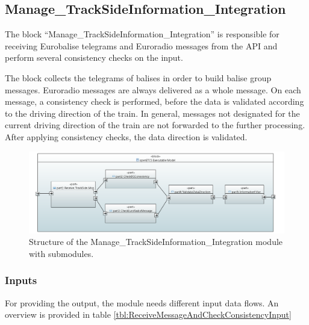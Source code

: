 
\subsection{Manage\_TrackSideInformation\_Integration}

The block ``Manage\_TrackSideInformation\_Integration'' is responsible for receiving Eurobalise telegrams and Euroradio messages from the API and perform several consistency checks on the input.

The block collects the telegrams of balises in order to build balise group messages. Euroradio messages are always delivered as a whole message. On each message, a consistency check is performed, before the data is validated according to the driving direction of the train. In general, messages not designated for the current driving direction of the train are not forwarded to the further processing. After applying consistency checks, the data direction is validated.


\begin{figure}
 \centering
 \includegraphics[width=\textwidth]{./images/Input-Messages4.PNG}
 \caption{Structure of the Manage\_TrackSideInformation\_Integration module with submodules.}
 \label{fig:receiveAndCheckConsistencyArch}
\end{figure}


\subsubsection{Inputs}
For providing the output, the module needs different input data flows. An overview is provided in table \ref{tbl:ReceiveMessageAndCheckConsistencyInput}

